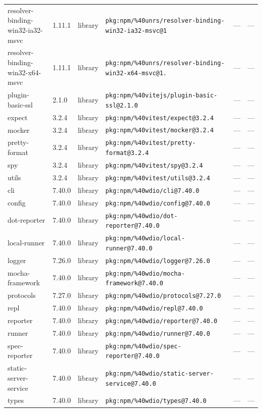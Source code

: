 \documentclass[11pt]{article}
\begin{document}
\begin{longtable}{|l|l|l|p{2.2cm}|l|p{4cm}|}
resolver-binding-win32-ia32-msvc & 1.11.1 & library & \texttt{pkg:npm/\%40unrs/resolver-binding-win32-ia32-msvc@1} & — & — \\
resolver-binding-win32-x64-msvc & 1.11.1 & library & \texttt{pkg:npm/\%40unrs/resolver-binding-win32-x64-msvc@1.} & — & — \\
plugin-basic-ssl & 2.1.0 & library & \texttt{pkg:npm/\%40vitejs/plugin-basic-ssl@2.1.0} & — & — \\
expect & 3.2.4 & library & \texttt{pkg:npm/\%40vitest/expect@3.2.4} & — & — \\
mocker & 3.2.4 & library & \texttt{pkg:npm/\%40vitest/mocker@3.2.4} & — & — \\
pretty-format & 3.2.4 & library & \texttt{pkg:npm/\%40vitest/pretty-format@3.2.4} & — & — \\
spy & 3.2.4 & library & \texttt{pkg:npm/\%40vitest/spy@3.2.4} & — & — \\
utils & 3.2.4 & library & \texttt{pkg:npm/\%40vitest/utils@3.2.4} & — & — \\
cli & 7.40.0 & library & \texttt{pkg:npm/\%40wdio/cli@7.40.0} & — & — \\
config & 7.40.0 & library & \texttt{pkg:npm/\%40wdio/config@7.40.0} & — & — \\
dot-reporter & 7.40.0 & library & \texttt{pkg:npm/\%40wdio/dot-reporter@7.40.0} & — & — \\
local-runner & 7.40.0 & library & \texttt{pkg:npm/\%40wdio/local-runner@7.40.0} & — & — \\
logger & 7.26.0 & library & \texttt{pkg:npm/\%40wdio/logger@7.26.0} & — & — \\
mocha-framework & 7.40.0 & library & \texttt{pkg:npm/\%40wdio/mocha-framework@7.40.0} & — & — \\
protocols & 7.27.0 & library & \texttt{pkg:npm/\%40wdio/protocols@7.27.0} & — & — \\
repl & 7.40.0 & library & \texttt{pkg:npm/\%40wdio/repl@7.40.0} & — & — \\
reporter & 7.40.0 & library & \texttt{pkg:npm/\%40wdio/reporter@7.40.0} & — & — \\
runner & 7.40.0 & library & \texttt{pkg:npm/\%40wdio/runner@7.40.0} & — & — \\
spec-reporter & 7.40.0 & library & \texttt{pkg:npm/\%40wdio/spec-reporter@7.40.0} & — & — \\
static-server-service & 7.40.0 & library & \texttt{pkg:npm/\%40wdio/static-server-service@7.40.0} & — & — \\
types & 7.40.0 & library & \texttt{pkg:npm/\%40wdio/types@7.40.0} & — & — \\

\end{longtable}
\end{document}
